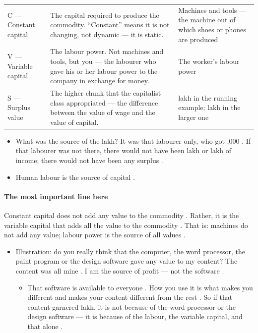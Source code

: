 \begin{table}[h!]
\centering
\begin{tabularx}{\textwidth}{lYY}
\toprule
{}
 &  &  \\
\midrule
C --- Constant capital & The capital required to produce the commodity. ``Constant'' means it is not changing, not dynamic --- it is static. & Machines and tools --- the machine out of which shoes or phones are produced \\
V --- Variable capital & The labour power. Not machines and tools, but you --- the labourer who gave his or her labour power to the company in exchange for money. & The worker's labour power \\
S --- Surplus value & The higher chunk that the capitalist class appropriated --- the difference between the value of wage and the value of capital. &  lakh in the running example;  lakh in the larger one \\
\bottomrule
\end{tabularx}
\end{table}

\begin{itemize}
    \item What was the source of the  lakh? It was that labourer only, who got ,000 . If that labourer was not there, there would not have been  lakh or  lakh of income; there would not have been any surplus .
    \item Human labour is the source of capital .
\end{itemize}

\paragraph{The most important line here}
\begin{KeyConcept}
Constant capital does not add any value to the commodity . Rather, it is the variable capital that adds all the value to the commodity . That is: machines do not add any value; labour power is the source of all values .
\end{KeyConcept}

\begin{itemize}
    \item Illustration: do you really think that the computer, the word processor, the paint program or the design software gave any value to my content?  The content was all mine . I am the source of profit --- not the software .
    \begin{itemize}
        \item That software is available to everyone . How you use it is what makes you different and makes your content different from the rest . So if that content garnered  lakh, it is not because of the word processor or the design software --- it is because of the labour, the variable capital, and that alone .
    \end{itemize}
\end{itemize}

